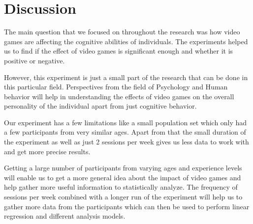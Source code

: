 \documentclass[conference]{IEEEtran}
\begin{document}
\section{Discussion}
\begin{flushleft}
    The main question that we focused on throughout the research was how video games are affecting the cognitive abilities of individuals. The experiments helped us to find if the effect of video games is significant enough and whether it is positive or negative.
\end{flushleft}
\newline
\newline
\begin{flushleft}
    However, this experiment is just a small part of the research that can be done in this particular field. Perspectives from the field of Psychology and Human behavior will help in understanding the effects of video games on the overall personality of the individual apart from just cognitive behavior.  
\end{flushleft}
\newline \newline
\begin{flushleft}
    Our experiment has a few limitations like a small population set which only had a few participants from very similar ages. Apart from that the small duration of the experiment as well as just 2 sessions per week gives us less data to work with and get more precise results.
\end{flushleft}

\begin{flushleft}
    Getting a large number of participants from varying ages and experience levels will enable us to get a more general idea about the impact of video games and help gather more useful information to statistically analyze. The frequency of sessions per week combined with a longer run of the experiment will help us to gather more data from the participants which can then be used to perform linear regression and different analysis models. 
\end{flushleft}
\end{document}
